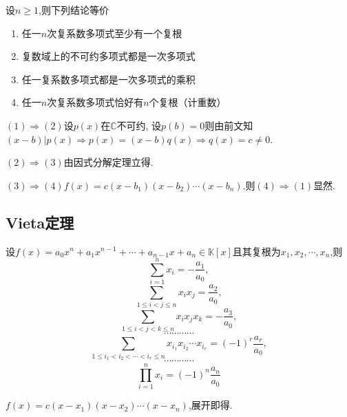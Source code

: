 \begin{green}
\begin{corollary}[代数学基本定理的等价命题]\label{cor:代数学基本定理的等价命题}
    设$n\geqslant 1$,则下列结论等价
    \begin{enumerate}[label={\textup{(\arabic*)}}]
        \item 任一$n$次复系数多项式至少有一个复根
        \item 复数域上的不可约多项式都是一次多项式
        \item 任一复系数多项式都是一次多项式的乘积
        \item 任一$n$次复系数多项式恰好有$n$个复根（计重数）
    \end{enumerate}
\end{corollary}
\begin{Proof}
$(1)\Longrightarrow (2)$设$p\left(x\right)$在$\mathbb{C}$不可约,
设$p\left(b\right)=0$则由前文知$\left(x-b\right)|p\left(x\right)\Longrightarrow p\left(x\right)=\left(x-b\right)q\left(x\right)\Longrightarrow q\left(x\right)=c\neq 0.$

$(2)\Longrightarrow (3)$由因式分解定理立得.

$(3)\Longrightarrow (4)$$f\left(x\right)=c\left(x-b_1\right)\left(x-b_2\right)\cdots\left(x-b_n\right)$.则$(4)\Longrightarrow (1)$显然.
\end{Proof}
\end{green}
\subsection{Vieta定理}
\begin{formal}
\begin{theorem}[Vieta定理]\label{thm:Vieta定理}
    设$f\left(x\right)=a_0x^n+a_1x^{n-1}+\cdots+a_{n-1}x+a_n\in\mathbb{K}\left[x
    \right]$且其复根为$x_1,x_2,\cdots,x_n$,则
    \[
    \sum_{i=1}^{n}x_i=-\frac{a_1}{a_0},
    \]
    \[
    \sum_{1\leqslant i<j\leqslant n}x_ix_j=\frac{a_2}{a_0},
    \]
    \[
    \sum_{1\leqslant i<j<k\leqslant n}x_ix_jx_k=-\frac{a_3}{a_0},
    \]
    \[
    \cdots\cdots\cdots\cdots
    \]
    \[
    \sum_{1\leqslant i_1<i_2<\cdots<i_r\leqslant n}x_{i_1}x_{i_2}\cdots x_{i_r}=\left(-1\right)^r\frac{a_r}{a_0},
    \]
    \[
    \cdots\cdots\cdots\cdots
    \]
    \[
    \prod_{i=1}^{n}x_i=\left(-1\right)^n\frac{a_n}{a_0}
    \]
\end{theorem}
\begin{Proof}
$f\left(x\right)=c\left(x-x_1\right)\left(x-x_2\right)\cdots\left(x-x_n\right)$,展开即得.
\end{Proof}
\end{formal}
